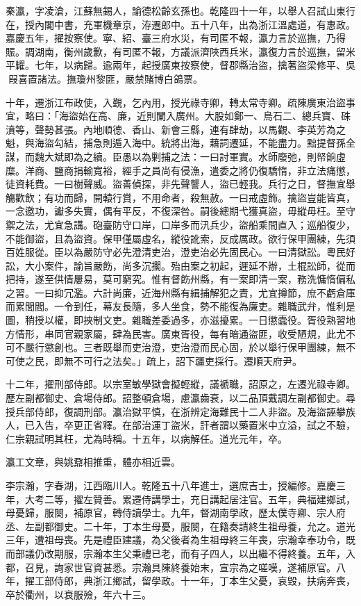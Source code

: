 \begin{pinyinscope}
秦瀛，字凌滄，江蘇無錫人，諭德松齡玄孫也。乾隆四十一年，以舉人召試山東行在，授內閣中書，充軍機章京，洊遷郎中。五十八年，出為浙江溫處道，有惠政。嘉慶五年，擢按察使。寧、紹、臺三府水災，有司匿不報，瀛力言於巡撫，乃得賑。調湖南，衡州歲歉，有司匿不報，方議派濟陜西兵米，瀛復力言於巡撫，留米平糶。七年，以病歸。逾兩年，起授廣東按察使，督郡縣治盜，擒著盜梁修平、吳叚喜置諸法。撫瓊州黎匪，嚴禁賭博白鴿票。

十年，遷浙江布政使，入覲，乞內用，授光祿寺卿，轉太常寺卿。疏陳廣東治盜事宜，略曰：「海盜始在高、廉，近則闌入廣州。大股如鄭一、烏石二、總兵寶、硃濆等，聲勢甚張。內地順德、香山、新會三縣，連有肆劫，以馬觀、李英芳為之魁，與海盜勾結，捕急則遁入海中。統將出海，藉詞遷延，不能盡力。黜提督孫全謀，而魏大斌即為之續。臣愚以為剿捕之法：一曰討軍實。水師廢弛，則帑餉虛糜。洋商、鹽商捐輸寬裕，經手之員尚有侵漁，遣委之將仍復驕惰，非立法痛懲，徒資耗費。一曰樹聲威。盜善偵探，非先聲讋人，盜已輕我。兵行之日，督撫宜舉觴歡飲；有功而歸，開轅行賞，不用命者，殺無赦。一曰戒虛飾。擒盜豈能皆真，一念邀功，讞多失實，偶有平反，不復深咎。嗣後總期弋獲真盜，毋縱毋枉。至守禦之法，尤宜急講。砲臺防守口岸，口岸多而汛兵少，盜船乘間直入；巡船復少，不能御盜，且為盜資。保甲僅屬虛名，縱役訛索，反成厲政。欲行保甲團練，先須百姓服從。臣以為嚴防守必先澄清吏治，澄吏治必先固民心。一曰清獄訟。粵民好訟，大小案件，諭旨嚴飭，尚多沉擱。殆由案之初起，遲延不辦，土棍訟師，從而把持，遂至供情屢易，莫可窮究。惟有督飭州縣，有一案即清一案，務洗慵惰偏私之習。一曰抑冗濫。六計尚廉，近海州縣有緝捕解犯之責，尤宜撙節，庶不虧倉庫而累閭閻。一令到任，幕友長隨，多人坐食，勢不能復為廉吏。雜職武弁，惟利是圖，稍授以權，即挾制文吏。雜職差委過多，亦滋擾累。一日懲蠹役。胥役熟習地方情形，串同官親家屬，肆為民害。廣東胥役，每有暗通盜匪，收受陋規，此尤不可不嚴行懲創也。三者既舉而吏治澄，吏治澄而民心固，於以舉行保甲團練，無不可使之民，即無不可行之法矣。」疏上，詔下疆吏採行。遷順天府尹。

十二年，擢刑部侍郎。以宗室敏學獄會擬輕縱，議褫職，詔原之，左遷光祿寺卿。歷左副都御史、倉場侍郎。詔整頓倉場，慮瀛齒衰，以二品頂戴調左副都御史。尋授兵部侍郎，復調刑部。瀛治獄平慎，在浙辨定海難民十二人非盜。及海盜誣攀族人，已入告，卒更正省釋。在部治運丁盜米，訐者謂以藥置米中立溢，試之不驗，仁宗親試明其枉，尤為時稱。十五年，以病解任。道光元年，卒。

瀛工文章，與姚鼐相推重，體亦相近雲。

李宗瀚，字春湖，江西臨川人。乾隆五十八年進士，選庶吉士，授編修。嘉慶三年，大考二等，擢左贊善。累遷侍講學士，充日講起居注官。五年，典福建鄉試，母憂歸，服闋，補原官，轉侍讀學士。九年，督湖南學政，歷太僕寺卿、宗人府丞、左副都御史。二十年，丁本生母憂，服闋，在籍奏請終生祖母養，允之。道光三年，遭祖母喪。先是禮臣建議，為父後者為生祖母終三年喪，宗瀚幸奉功令，既而部議仍改期服，宗瀚本生父秉禮已老，而有子四人，以出繼不得終養。五年，入都，召見，詢家世官資甚悉。宗瀚具陳終養始末，宣宗為之嗟嘆，遂補原官。八年，擢工部侍郎，典浙江鄉試，留學政。十一年，丁本生父憂，哀毀，扶病奔喪，卒於衢州，以衰服殮，年六十三。


\end{pinyinscope}
